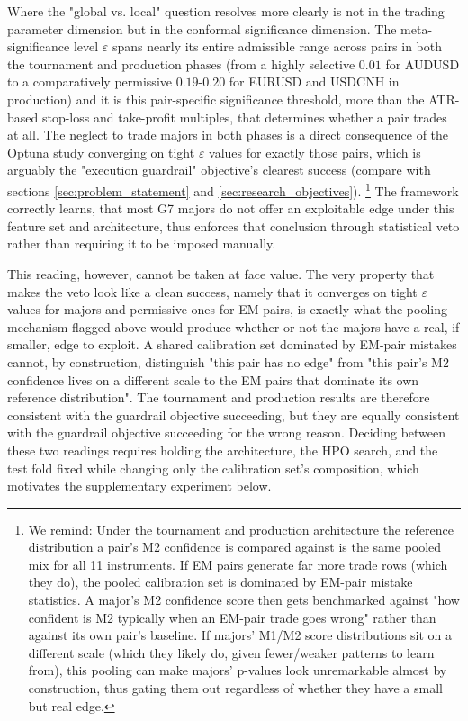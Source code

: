 \documentclass[12pt, a4paper]{article}
\begin{document}
\medskip

Where the "global vs. local" question resolves more clearly is not in the trading parameter dimension but in the conformal significance dimension. The meta-significance level 
$\varepsilon$ spans nearly its entire admissible range across pairs in both the tournament and production phases (from a highly selective $0.01$ for AUDUSD to a comparatively 
permissive $0.19$-$0.20$ for EURUSD and USDCNH in production) and it is this pair-specific significance threshold, more than the ATR-based stop-loss and take-profit multiples, 
that determines whether a pair trades at all. The neglect to trade majors in both phases is a direct consequence of the Optuna study converging on tight $\varepsilon$ values 
for exactly those pairs, which is arguably the "execution guardrail" objective's clearest success (compare with sections \ref{sec:problem_statement} and \ref{sec:research_objectives}).
\footnote{We remind: Under the tournament and production architecture the reference distribution a pair's M2 confidence is compared against is the same pooled mix for 
all 11 instruments. If EM pairs generate far more trade rows (which they do), the pooled calibration set is dominated by EM-pair mistake statistics. A major's M2 confidence score 
then gets benchmarked against "how confident is M2 typically when an EM-pair trade goes wrong" rather than against its own pair's baseline. 
If majors' M1/M2 score distributions sit on a different scale (which they likely do, given fewer/weaker patterns to learn from), this pooling can make majors' p-values look 
unremarkable almost by construction, thus gating them out regardless of whether they have a small but real edge.} 
The framework correctly learns, that most G7 majors do not offer an exploitable edge under this feature set and architecture, thus enforces that conclusion through statistical veto 
rather than requiring it to be imposed manually.

\medskip

This reading, however, cannot be taken at face value. The very property that makes the veto look like a clean success, namely that it converges on tight $\varepsilon$ values 
for majors and permissive ones for EM pairs, is exactly what the pooling mechanism flagged above would produce whether or not the majors have a real, if smaller, edge to 
exploit. A shared calibration set dominated by EM-pair mistakes cannot, by construction, distinguish "this pair has no edge" from "this pair's M2 confidence lives on a 
different scale to the EM pairs that dominate its own reference distribution". The tournament and production results are therefore consistent with the guardrail objective 
succeeding, but they are equally consistent with the guardrail objective succeeding for the wrong reason. Deciding between these two readings requires holding the 
architecture, the HPO search, and the test fold fixed while changing only the calibration set's composition, which motivates the supplementary experiment below.
\end{document}
